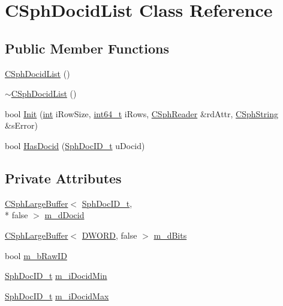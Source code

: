 \hypertarget{classCSphDocidList}{\section{C\-Sph\-Docid\-List Class Reference}
\label{classCSphDocidList}
}
\subsection*{Public Member Functions}
\begin{DoxyCompactItemize}
\item 
\hyperlink{classCSphDocidList_af3bdc2a43922f1ab9791cf6f70951d1b}{C\-Sph\-Docid\-List} ()
\item 
\hyperlink{classCSphDocidList_a89d89e2ffc29242bebfc570909a0f573}{$\sim$\-C\-Sph\-Docid\-List} ()
\item 
bool \hyperlink{classCSphDocidList_a23948fdfc742931213cbc8bc785058f4}{Init} (\hyperlink{sphinxexpr_8cpp_a4a26e8f9cb8b736e0c4cbf4d16de985e}{int} i\-Row\-Size, \hyperlink{sphinxstd_8h_a996e72f71b11a5bb8b3b7b6936b1516d}{int64\-\_\-t} i\-Rows, \hyperlink{classCSphReader}{C\-Sph\-Reader} \&rd\-Attr, \hyperlink{structCSphString}{C\-Sph\-String} \&s\-Error)
\item 
bool \hyperlink{classCSphDocidList_a0aed9d8ad02eec1b0991c4842ff43002}{Has\-Docid} (\hyperlink{sphinx_8h_a3176771631c12a9e4897272003e6b447}{Sph\-Doc\-I\-D\-\_\-t} u\-Docid)
\end{DoxyCompactItemize}
\subsection*{Private Attributes}
\begin{DoxyCompactItemize}
\item 
\hyperlink{classCSphLargeBuffer}{C\-Sph\-Large\-Buffer}$<$ \hyperlink{sphinx_8h_a3176771631c12a9e4897272003e6b447}{Sph\-Doc\-I\-D\-\_\-t}, \\*
false $>$ \hyperlink{classCSphDocidList_a6f750ead8cc41f1ecc5fdd378f008d6e}{m\-\_\-d\-Docid}
\item 
\hyperlink{classCSphLargeBuffer}{C\-Sph\-Large\-Buffer}$<$ \hyperlink{sphinxstd_8h_a798af1e30bc65f319c1a246cecf59e39}{D\-W\-O\-R\-D}, false $>$ \hyperlink{classCSphDocidList_aa79ef09236634aca8aaa26099162e3c8}{m\-\_\-d\-Bits}
\item 
bool \hyperlink{classCSphDocidList_aa5c5984489008f76b4706b3aed7281e6}{m\-\_\-b\-Raw\-I\-D}
\item 
\hyperlink{sphinx_8h_a3176771631c12a9e4897272003e6b447}{Sph\-Doc\-I\-D\-\_\-t} \hyperlink{classCSphDocidList_a1e1d6fd324395f9037e7c73545773f2e}{m\-\_\-i\-Docid\-Min}
\item 
\hyperlink{sphinx_8h_a3176771631c12a9e4897272003e6b447}{Sph\-Doc\-I\-D\-\_\-t} \hyperlink{classCSphDocidList_aab4f4fb93cac565d321cf5127488d87d}{m\-\_\-i\-Docid\-Max}
\end{DoxyCompactItemize}


